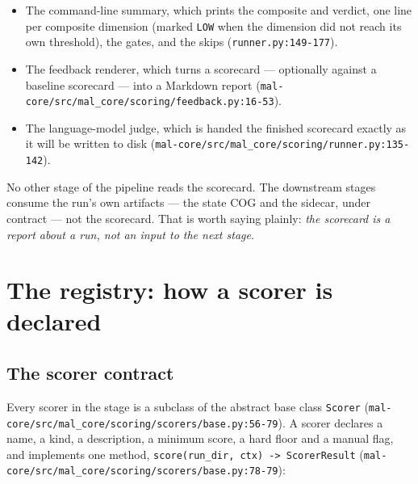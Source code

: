 \documentclass[11pt,a4paper]{article}
\newcommand{\code}[1]{\texttt{#1}}
\begin{document}
\begin{itemize}
\item The command-line summary, which prints the composite and verdict, one
      line per composite dimension (marked \code{LOW} when the dimension did
      not reach its own threshold), the gates, and the skips
      (\code{runner.py:149-177}).
\item The feedback renderer, which turns a scorecard --- optionally against a
      baseline scorecard --- into a Markdown report
      (\code{mal-core/src/mal\_core/scoring/feedback.py:16-53}).
\item The language-model judge, which is handed the finished scorecard
      exactly as it will be written to disk
      (\code{mal-core/src/mal\_core/scoring/runner.py:135-142}).
\end{itemize}

No other stage of the pipeline reads the scorecard. The downstream stages
consume the run's own artifacts --- the state COG and the sidecar, under
contract  --- not the scorecard. That is worth
saying plainly: \emph{the scorecard is a report about a run, not an input to
the next stage}.

\section{The registry: how a scorer is declared}

\subsection{The scorer contract}

Every scorer in the stage is a subclass of the abstract base class
\code{Scorer}
(\code{mal-core/src/mal\_core/scoring/scorers/base.py:56-79}). A scorer
declares a name, a kind, a description, a minimum score, a hard floor and a
manual flag, and implements one method,
\code{score(run\_dir, ctx) -> ScorerResult}
(\code{mal-core/src/mal\_core/scoring/scorers/base.py:78-79}):
\end{document}
